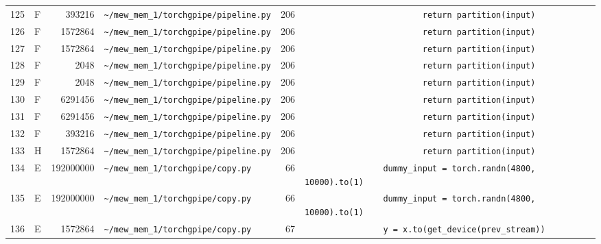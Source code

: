 \documentclass{article}
\begin{document}
\begin{longtable}{r l r p{6.5cm} r p{7.0cm}}
125 & F & 393216 & \lstinline|~/mew_mem_1/torchgpipe/pipeline.py| & 206 & \lstinline|                        return partition(input)| \\
126 & F & 1572864 & \lstinline|~/mew_mem_1/torchgpipe/pipeline.py| & 206 & \lstinline|                        return partition(input)| \\
127 & F & 1572864 & \lstinline|~/mew_mem_1/torchgpipe/pipeline.py| & 206 & \lstinline|                        return partition(input)| \\
128 & F & 2048 & \lstinline|~/mew_mem_1/torchgpipe/pipeline.py| & 206 & \lstinline|                        return partition(input)| \\
129 & F & 2048 & \lstinline|~/mew_mem_1/torchgpipe/pipeline.py| & 206 & \lstinline|                        return partition(input)| \\
130 & F & 6291456 & \lstinline|~/mew_mem_1/torchgpipe/pipeline.py| & 206 & \lstinline|                        return partition(input)| \\
131 & F & 6291456 & \lstinline|~/mew_mem_1/torchgpipe/pipeline.py| & 206 & \lstinline|                        return partition(input)| \\
132 & F & 393216 & \lstinline|~/mew_mem_1/torchgpipe/pipeline.py| & 206 & \lstinline|                        return partition(input)| \\
133 & H & 1572864 & \lstinline|~/mew_mem_1/torchgpipe/pipeline.py| & 206 & \lstinline|                        return partition(input)| \\
134 & E & 192000000 & \lstinline|~/mew_mem_1/torchgpipe/copy.py| & 66 & \lstinline|                dummy_input = torch.randn(4800, 10000).to(1)| \\
135 & E & 192000000 & \lstinline|~/mew_mem_1/torchgpipe/copy.py| & 66 & \lstinline|                dummy_input = torch.randn(4800, 10000).to(1)| \\
136 & E & 1572864 & \lstinline|~/mew_mem_1/torchgpipe/copy.py| & 67 & \lstinline|                y = x.to(get_device(prev_stream))| \\
\end{longtable}
\end{document}
